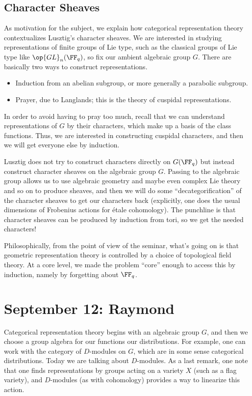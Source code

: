 \documentclass{article}
\begin{document}
\subsection{Character Sheaves}
As motivation for the subject, we explain how categorical representation theory contextualizes Lusztig's character sheaves. We are interested in studying representations of finite groups of Lie type, such as the classical groups of Lie type like $\op{GL}_n(\FF_q)$, so fix our ambient algebraic group $G$. There are basically two ways to construct representations.
\begin{itemize}
	\item Induction from an abelian subgroup, or more generally a parabolic subgroup.
	\item Prayer, due to Langlands; this is the theory of cuspidal representations.
\end{itemize}
In order to avoid having to pray too much, recall that we can understand representations of $G$ by their characters, which make up a basis of the class functions. Thus, we are interested in constructing cuspidal characters, and then we will get everyone else by induction.

Lusztig does not try to construct characters directly on $G(\FF_q)$ but instead construct character sheaves on the algebraic group $G$. Passing to the algebraic group allows us to use algebraic geometry and maybe even complex Lie theory and so on to produce sheaves, and then we will do some ``decategorification'' of the character sheaves to get our characters back (explicitly, one does the usual dimensions of Frobenius actions for \'etale cohomology). The punchline is that character sheaves can be produced by induction from tori, so we get the needed characters!
\begin{remark}
	Philosophically, from the point of view of the seminar, what's going on is that geometric representation theory is controlled by a choice of topological field theory. At a core level, we made the problem ``core'' enough to access this by induction, namely by forgetting about $\FF_q$.
\end{remark}

\section{September 12: Raymond}
Categorical representation theory begins with an algebraic group $G$, and then we choose a group algebra for our functions our distributions. For example, one can work with the category of $D$-modules on $G$, which are in some sense categorical distributions. Today we are talking about $D$-modules. As a last remark, one note that one finds representations by groups acting on a variety $X$ (such as a flag variety), and $D$-modules (as with cohomology) provides a way to linearize this action.
\end{document}
